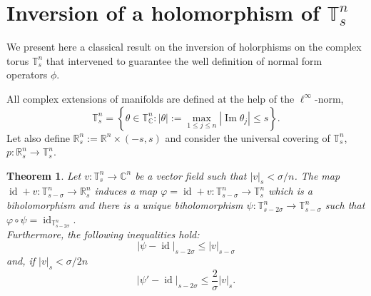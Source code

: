 \documentclass[oneside, 11pt]{amsbook}
\newcommand{\set}[1]{{\left\{#1\right\}}}
\newcommand{\abs}[1]{{\left|#1\right|}}
\newcommand{\T}{\mathbb{T}}
\newcommand{\R}{\mathbb{R}}
\newcommand{\C}{\mathbb{C}}
\newcommand{\teta}{\theta}
\renewcommand{\Im}{\operatorname{Im}}
\newcommand{\id}{\operatorname{id}}
\newcommand{\0}{{(0)}}
\newcommand{\3}{{(3)}}
\newtheorem{thm}{Theorem}[section]
\numberwithin{equation}{section}
\numberwithin{defn}{section}
\numberwithin{prop}{section}
\numberwithin{cor}{section}
\numberwithin{lemma}{section}
\numberwithin{rmk}{section}
\numberwithin{corollary}{section}
\begin{document}
\section{Inversion of a holomorphism of $ \T^n_s $ }
We present here a classical result on the inversion of holorphisms on the complex torus $\T^n_s$ that intervened to guarantee the well definition of normal form operators $\phi$.

All complex extensions of manifolds are defined at the help of the $\ell^\infty$-norm, \[\T^n_s = \set{\teta\in\T^n_\C : \abs{\teta}:= \max_{1\leq j\leq n}\abs{\Im{\teta_j}}\leq s}.\]
Let also define $\R^n_s := \R^n \times (-s,s)$ and consider the universal covering of $\T^n_s$, $p: \R^n_s\to \T^n_s$.
\begin{thm}
	\label{theorem well def} Let $v:\T^n_s\to\C^n$ be a vector field such that $\abs{v}_s < \sigma/n$. The map $\id + v:\T^n_{s-\sigma}\to\R^n_{s}$ induces a map $\varphi = \id + v : \T^n_{s-\sigma}\to\T^n_s$ which is a biholomorphism and there is a unique biholomorphism $\psi : \T^n_{s-2\sigma}\to\T^n_{s-\sigma}$ such that $\varphi\circ\psi = \id_{\T^n_{s - 2\sigma}}.$ \\
	Furthermore, the following inequalities hold: \[\abs{\psi - \id}_{s-2\sigma}\leq \abs{v}_{s-\sigma}\] and, if $\abs{v}_s<\sigma/2n$ \[\abs{\psi' - \id}_{s-2\sigma}\leq \frac{2}{\sigma}\abs{v}_{s}.\]
\end{thm}
\end{document}
